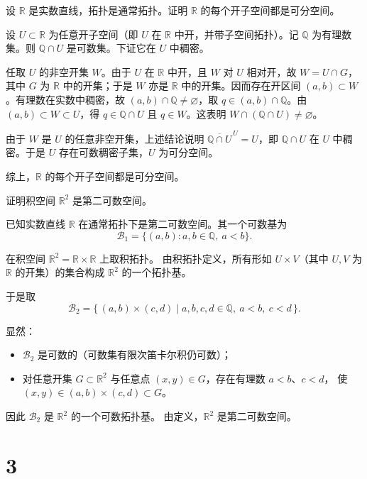 \begin{homework}[11]
设 $\mathbb{R}$ 是实数直线，拓扑是通常拓扑。证明 $\mathbb{R}$ 的每个开子空间都是可分空间。
\end{homework}
\begin{solution}
设 $U\subset\mathbb{R}$ 为任意开子空间（即 $U$ 在 $\mathbb{R}$ 中开，并带子空间拓扑）。记 $\mathbb{Q}$ 为有理数集。则 $\mathbb{Q}\cap U$ 是可数集。下证它在 $U$ 中稠密。

任取 $U$ 的非空开集 $W$。由于 $U$ 在 $\mathbb{R}$ 中开，且 $W$ 对 $U$ 相对开，故 $W=U\cap G$，其中 $G$ 为 $\mathbb{R}$ 中的开集；于是 $W$ 亦是 $\mathbb{R}$ 中的开集。因而存在开区间 $(a,b)\subset W$。有理数在实数中稠密，故 $(a,b)\cap\mathbb{Q}\neq\varnothing$，取 $q\in (a,b)\cap\mathbb{Q}$。由 $(a,b)\subset W\subset U$，得 $q\in \mathbb{Q}\cap U$ 且 $q\in W$。这表明 $W\cap(\mathbb{Q}\cap U)\neq\varnothing$。

由于 $W$ 是 $U$ 的任意非空开集，上述结论说明 $\overline{\mathbb{Q}\cap U}^{\,U}=U$，即 $\mathbb{Q}\cap U$ 在 $U$ 中稠密。于是 $U$ 存在可数稠密子集，$U$ 为可分空间。

综上，$\mathbb{R}$ 的每个开子空间都是可分空间。
\end{solution}
\begin{homework}[12]
证明积空间 $\mathbb{R}^2$ 是第二可数空间。
\end{homework}
\begin{solution}
已知实数直线 $\mathbb{R}$ 在通常拓扑下是第二可数空间。其一个可数基为
\[
\mathcal{B}_1 = \{(a,b): a,b\in\mathbb{Q},\ a<b\}.
\]

在积空间 $\mathbb{R}^2 = \mathbb{R}\times\mathbb{R}$ 上取积拓扑。  
由积拓扑定义，所有形如 $U\times V$（其中 $U,V$ 为 $\mathbb{R}$ 的开集）的集合构成 $\mathbb{R}^2$ 的一个拓扑基。

于是取
\[
\mathcal{B}_2 = \{\, (a,b)\times(c,d)\mid a,b,c,d\in\mathbb{Q},\ a<b,\ c<d \,\}.
\]

显然：
\begin{itemize}
  \item $\mathcal{B}_2$ 是可数的（可数集有限次笛卡尔积仍可数）；
  \item 对任意开集 $G\subset\mathbb{R}^2$ 与任意点 $(x,y)\in G$，存在有理数 $a<b$、$c<d$，
        使 $(x,y)\in(a,b)\times(c,d)\subset G$。
\end{itemize}

因此 $\mathcal{B}_2$ 是 $\mathbb{R}^2$ 的一个可数拓扑基。  
由定义，$\mathbb{R}^2$ 是第二可数空间。
\end{solution}
\chapter{3}
